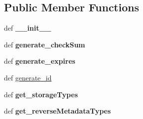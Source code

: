 \subsection*{Public Member Functions}
\begin{DoxyCompactItemize}
\item 
\hypertarget{classcheshire3_1_1base_store_1_1_simple_store_a5e942e71f96ac8df9040300fa2bca3f0}{def {\bfseries \-\_\-\-\_\-init\-\_\-\-\_\-}}\label{classcheshire3_1_1base_store_1_1_simple_store_a5e942e71f96ac8df9040300fa2bca3f0}

\item 
\hypertarget{classcheshire3_1_1base_store_1_1_simple_store_a29839b675071d924f5f0ef28f6b24407}{def {\bfseries generate\-\_\-check\-Sum}}\label{classcheshire3_1_1base_store_1_1_simple_store_a29839b675071d924f5f0ef28f6b24407}

\item 
\hypertarget{classcheshire3_1_1base_store_1_1_simple_store_a97a932591370ab252b5a4c2a7d096402}{def {\bfseries generate\-\_\-expires}}\label{classcheshire3_1_1base_store_1_1_simple_store_a97a932591370ab252b5a4c2a7d096402}

\item 
def \hyperlink{classcheshire3_1_1base_store_1_1_simple_store_a6c7d2446f317c6e0dbd1cdf0d9d4a5c4}{generate\-\_\-id}
\item 
\hypertarget{classcheshire3_1_1base_store_1_1_simple_store_a281e85bf5e14ab621f017cc97d741b57}{def {\bfseries get\-\_\-storage\-Types}}\label{classcheshire3_1_1base_store_1_1_simple_store_a281e85bf5e14ab621f017cc97d741b57}

\item 
\hypertarget{classcheshire3_1_1base_store_1_1_simple_store_a014caef431aeaafcb3022ea18a1a55d2}{def {\bfseries get\-\_\-reverse\-Metadata\-Types}}\label{classcheshire3_1_1base_store_1_1_simple_store_a014caef431aeaafcb3022ea18a1a55d2}


\end{DoxyCompactItemize}
